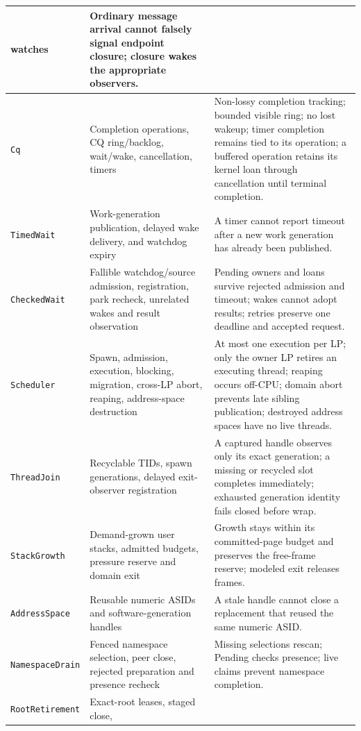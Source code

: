 \begin{longtable}{|p{}|p{}|p{}|}
    watches & Ordinary message arrival cannot falsely signal endpoint closure;
    closure wakes the appropriate observers. \\
\hline
\texttt{Cq} & Completion operations, CQ ring/backlog, wait/wake,
    cancellation, timers & Non-lossy completion tracking; bounded visible ring;
    no lost wakeup; timer completion remains tied to its operation; a buffered
    operation retains its kernel loan through cancellation until terminal completion. \\
\hline
\texttt{TimedWait} & Work-generation publication, delayed wake
    delivery, and watchdog expiry & A timer cannot report timeout after a new
    work generation has already been published. \\
\hline
\texttt{CheckedWait} & Fallible watchdog/source admission,
    registration, park recheck, unrelated wakes and result observation &
    Pending owners and loans survive rejected admission and timeout; wakes
    cannot adopt results; retries preserve one deadline and accepted request. \\
\hline
\texttt{Scheduler} & Spawn, admission, execution, blocking, migration,
    cross-LP abort, reaping, address-space destruction & At most one execution
    per LP; only the owner LP retires an executing thread; reaping occurs
    off-CPU; domain abort prevents late sibling publication; destroyed address
    spaces have no live threads. \\
\hline
\texttt{ThreadJoin} & Recyclable TIDs, spawn generations, delayed
    exit-observer registration & A captured handle observes only its exact
    generation; a missing or recycled slot completes immediately; exhausted
    generation identity fails closed before wrap. \\
\hline
\texttt{StackGrowth} & Demand-grown user stacks, admitted budgets,
    pressure reserve and domain exit & Growth stays within its committed-page
    budget and preserves the free-frame reserve; modeled exit releases frames. \\
\hline
\texttt{AddressSpace} & Reusable numeric ASIDs and software-generation
    handles & A stale handle cannot close a replacement that reused the same
    numeric ASID. \\
\hline
\texttt{NamespaceDrain} & Fenced namespace selection, peer close,
    rejected preparation and presence recheck & Missing selections rescan;
    Pending checks presence; live claims prevent namespace completion. \\
\hline
\texttt{RootRetirement} & Exact-root leases, staged close,

\end{longtable}
